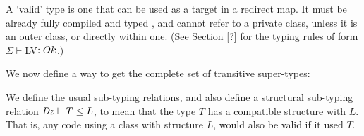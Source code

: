 \begin{defs}
	
\end{defs}

A `valid' type is one that can be used as a target in a redirect map. It must be already fully compiled and typed , and cannot refer to a private class, unless it is an outer class, or directly within one. (See Section \ref{?} for the typing rules of form $\Sigma \vdash $LV$ : {Ok}$.)


We now define a way to get the complete set of transitive super-types:

\begin{defs}
\end{defs}

We define the usual sub-typing relations, and also define a structural sub-typing relation $\mathit{Dz} \vdash T \leq L$, to mean that the type $T$ has a compatible structure with $L$. That is, any code using a class with structure $L$, would also be valid if it used $T$.

